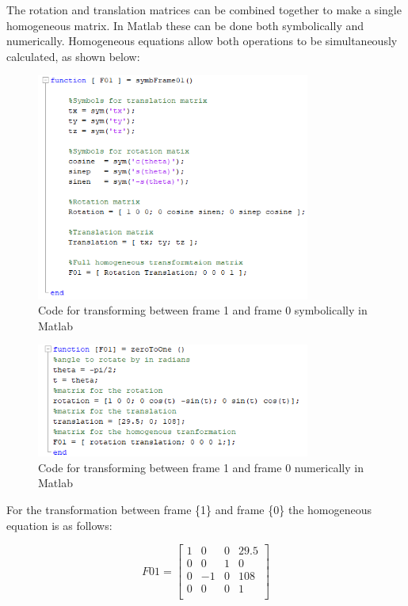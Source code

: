 \documentclass [11pt]{report}
\begin{document}
The rotation and translation matrices can be combined together to make a single homogeneous matrix. In Matlab these can be done both symbolically and numerically. Homogeneous equations allow both operations to be simultaneously calculated, as shown below:

\begin{figure}[H]
\centerline{\includegraphics[width=9cm]{symbFrame01.png}}
\caption{Code for transforming between frame 1 and frame 0 symbolically in Matlab}
\label{fig}
\end{figure}

\begin{figure}[H]
\centerline{\includegraphics[width=9cm]{zeroToOnecode.png}}
\caption{Code for transforming between frame 1 and frame 0 numerically in Matlab}
\label{fig}
\end{figure}

For the transformation between frame \{1\} and frame \{0\} the homogeneous equation is as follows: 

\begin{equation*}
F01
= 
\begin{bmatrix}
1&0&0&29.5\\
0&0&1&0\\
0&-1&0&108\\
0&0&0&1\\
\end{bmatrix}
\end{equation*}
\end{document}
